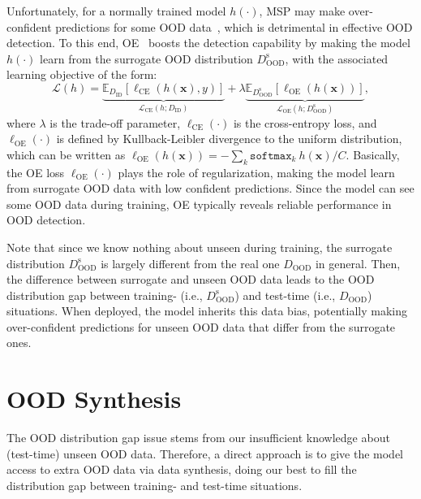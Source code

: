 \documentclass{article} \usepackage{iclr2022_conference,times}
\begin{document}
Unfortunately, for a normally trained model $h(\cdot)$, MSP may make over-confident predictions for some OOD data~\citep{liu2020energy}, which is detrimental in effective OOD detection. To this end, OE~\citep{HendrycksMD19} boosts the detection capability by making the model $h(\cdot)$ learn from the surrogate OOD distribution $D^\text{s}_\text{OOD}$, with the associated learning objective of the form:
\begin{equation}
    {\mathcal{L}}(h)=\underbrace{\mathbb{E}_{D_\text{ID}}\left[\ell_\text{CE}(h(\boldsymbol{x}),y)\right]}_{{\mathcal{L}}_\text{CE}(h; D_\text{ID})}
     + \lambda \underbrace{\mathbb{E}_{D^\text{s}_\text{OOD}}\left[\ell_\text{OE}(h(\boldsymbol{x}))\right]}_{{\mathcal{L}}_\text{OE}(h; D^\text{s}_\text{OOD})}, \label{eq: oe}
\end{equation}
where $\lambda$ is the trade-off parameter,  $\ell_\text{CE}(\cdot)$ is the cross-entropy loss, and $\ell_\text{OE}(\cdot)$ is defined by Kullback-Leibler divergence to the uniform distribution, which can be written as $\ell_\text{OE}(h(\boldsymbol{x}))=-\sum_k \texttt{softmax}_k~h(\boldsymbol{x}) / C$. Basically, the OE loss $\ell_\text{OE}(\cdot)$ plays the role of regularization, making the model learn from surrogate OOD data with low confident predictions. Since the model can see some OOD data during training, OE typically reveals reliable performance in OOD detection. 

Note that since we know nothing about unseen during training, the surrogate distribution ${D}^\text{s}_\text{OOD}$ is largely different from the real one ${D}_\text{OOD}$ in general. Then, the difference between surrogate and unseen OOD data leads to the OOD distribution gap between training- (i.e., $D^\text{s}_\text{OOD}$) and test-time (i.e., $D_\text{OOD}$) situations. When deployed, the model inherits this data bias, potentially making over-confident predictions for unseen OOD data that differ from the surrogate ones. 











\section{OOD Synthesis}

The OOD distribution gap issue stems from our insufficient knowledge about (test-time) unseen OOD data. Therefore, a direct approach is to give the model access to extra OOD data via data synthesis, doing our best to fill the distribution gap between training- and test-time situations.
\end{document}
